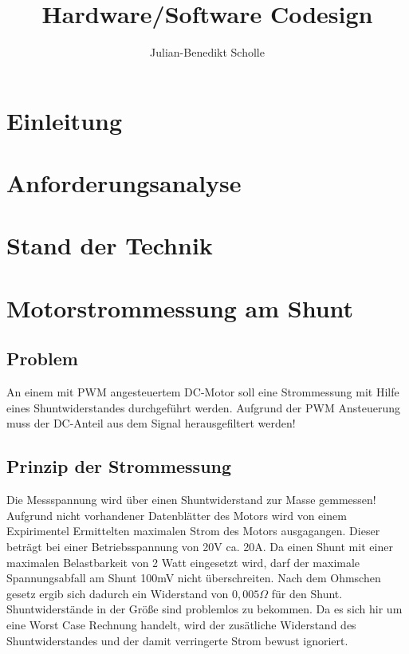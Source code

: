\documentclass[11pt,twoside,openright]{mpreport}
\title{Hardware/Software Codesign}
\author{Julian-Benedikt Scholle}
\begin{document}
\maketitle
\tableofcontents

\chapter{Einleitung}

\chapter{Anforderungsanalyse}

\chapter{Stand der Technik}

\chapter{Motorstrommessung am Shunt}


\section{Problem}

An einem mit PWM angesteuertem DC-Motor soll eine Strommessung mit Hilfe eines Shuntwiderstandes
durchgeführt werden. Aufgrund der PWM Ansteuerung muss der DC-Anteil aus dem Signal herausgefiltert werden!


\section{Prinzip der Strommessung}

Die Messspannung wird über einen Shuntwiderstand zur Masse gemmessen! Aufgrund nicht vorhandener Datenblätter des Motors
wird von einem Expirimentel Ermittelten maximalen Strom des Motors ausgagangen. Dieser beträgt bei einer Betriebsspannung von 20V ca. 20A.
Da einen Shunt mit einer maximalen Belastbarkeit von 2 Watt eingesetzt wird, darf der maximale Spannungsabfall am Shunt 100mV nicht überschreiten.
Nach dem Ohmschen gesetz ergib sich dadurch ein Widerstand von $0,005 \Omega$  für den Shunt. Shuntwiderstände in der Größe sind problemlos zu bekommen.
Da es sich hir um eine Worst Case Rechnung handelt, wird der zusätliche Widerstand des Shuntwiderstandes und der damit verringerte Strom bewust ignoriert.
\end{document}
